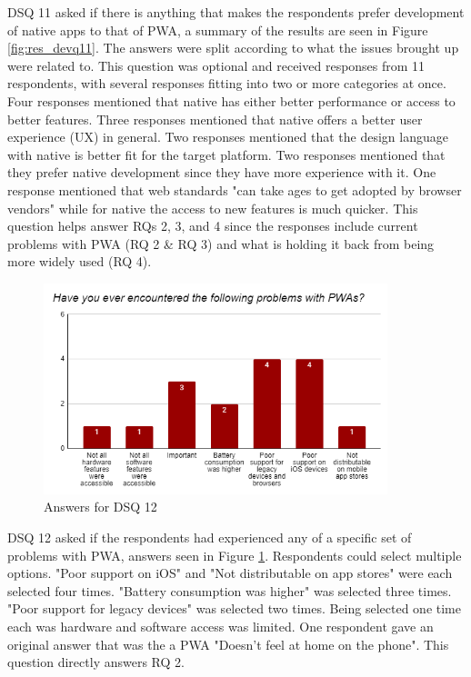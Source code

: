\documentclass[a4paper,12pt]{article}
\begin{document}
DSQ 11 asked if there is anything that makes the respondents prefer development of native apps to that of PWA, a summary of the results are seen in Figure \ref{fig:res_devq11}. The answers were split according to what the issues brought up were related to. This question was optional and received responses from 11 respondents, with several responses fitting into two or more categories at once. Four responses mentioned that native has either better performance or access to better features. Three responses mentioned that native offers a better user experience (UX) in general. Two responses mentioned that the design language with native is better fit for the target platform. Two responses mentioned that they prefer native development since they have more experience with it. One response mentioned that web standards "can take ages to get adopted by browser vendors" while for native the access to new features is much quicker. This question helps answer RQs 2, 3, and 4 since the responses include current problems with PWA (RQ 2 \& RQ 3) and what is holding it back from being more widely used (RQ 4).

\begin{figure}[ht!]
    \centering
    \includegraphics[width=10cm]{img/Results/dsq12.png}
    \caption{Answers for DSQ 12}
    \label{fig:res_devq12}
\end{figure}

DSQ 12 asked if the respondents had experienced any of a specific set of problems with PWA, answers seen in Figure \ref{fig:res_devq12}. Respondents could select multiple options. "Poor support on iOS" and "Not distributable on app stores" were each selected four times. "Battery consumption was higher" was selected three times. "Poor support for legacy devices" was selected two times. Being selected one time each was hardware and software access was limited. One respondent gave an original answer that was the a PWA "Doesn't feel at home on the phone". This question directly answers RQ 2.
\end{document}
